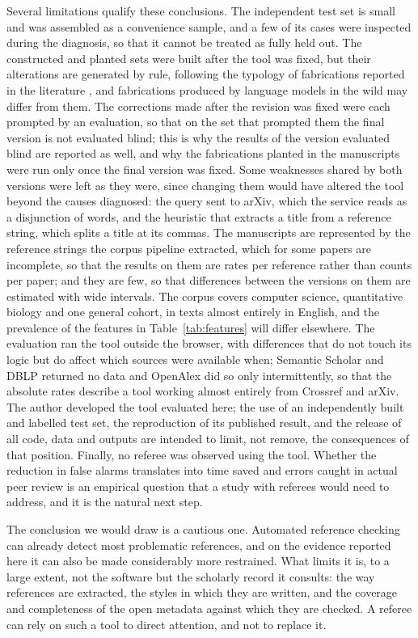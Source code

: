 \documentclass[pdflatex,sn-apa]{sn-jnl}
\begin{document}
Several limitations qualify these conclusions. The independent test set is small and was assembled as a convenience sample, and a few of its cases were inspected during the diagnosis, so that it cannot be treated as fully held out. The constructed and planted sets were built after the tool was fixed, but their alterations are generated by rule, following the typology of fabrications reported in the literature \citep{russinovich2026, shi2026}, and fabrications produced by language models in the wild may differ from them. The corrections made after the revision was fixed were each prompted by an evaluation, so that on the set that prompted them the final version is not evaluated blind; this is why the results of the version evaluated blind are reported as well, and why the fabrications planted in the manuscripts were run only once the final version was fixed. Some weaknesses shared by both versions were left as they were, since changing them would have altered the tool beyond the causes diagnosed: the query sent to arXiv, which the service reads as a disjunction of words, and the heuristic that extracts a title from a reference string, which splits a title at its commas. The manuscripts are represented by the reference strings the corpus pipeline extracted, which for some papers are incomplete, so that the results on them are rates per reference rather than counts per paper; and they are few, so that differences between the versions on them are estimated with wide intervals. The corpus covers computer science, quantitative biology and one general cohort, in texts almost entirely in English, and the prevalence of the features in Table~\ref{tab:features} will differ elsewhere. The evaluation ran the tool outside the browser, with differences that do not touch its logic but do affect which sources were available when; Semantic Scholar and DBLP returned no data and OpenAlex did so only intermittently, so that the absolute rates describe a tool working almost entirely from Crossref and arXiv. The author developed the tool evaluated here; the use of an independently built and labelled test set, the reproduction of its published result, and the release of all code, data and outputs are intended to limit, not remove, the consequences of that position. Finally, no referee was observed using the tool. Whether the reduction in false alarms translates into time saved and errors caught in actual peer review is an empirical question that a study with referees would need to address, and it is the natural next step.

The conclusion we would draw is a cautious one. Automated reference checking can already detect most problematic references, and on the evidence reported here it can also be made considerably more restrained. What limits it is, to a large extent, not the software but the scholarly record it consults: the way references are extracted, the styles in which they are written, and the coverage and completeness of the open metadata against which they are checked. A referee can rely on such a tool to direct attention, and not to replace it.
\end{document}
